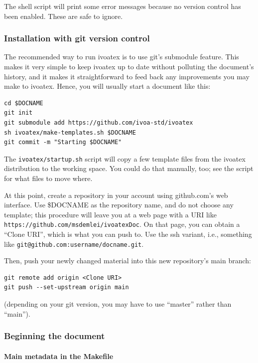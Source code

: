 \documentclass[11pt,a4paper]{ivoa}
\begin{document}
The shell script will print some error messages because no version
control has been enabled.  These are safe to ignore.

\subsubsection{Installation with git version control}

The recommended way to run ivoatex
is to use git's submodule feature.  This makes it very simple to keep
ivoatex up to date without polluting the
document's history, and it makes it straightforward to 
feed back any improvements you may make to ivoatex.  Hence, you will
usually start a document like this:

\begin{lstlisting}[basicstyle=\footnotesize]
cd $DOCNAME
git init
git submodule add https://github.com/ivoa-std/ivoatex
sh ivoatex/make-templates.sh $DOCNAME
git commit -m "Starting $DOCNAME"
\end{lstlisting}

The \verb|ivoatex/startup.sh| script will copy a few template files from
the ivoatex distribution to the working space.  You could do that
manually, too; see the script for what files to move where.

At this point, create a repository in your account using github.com's web
interface. Use \$DOCNAME as the repository name, and do not choose any
template; this procedure will leave you at a web page with a URI like
\nolinkurl{https://github.com/msdemlei/ivoatexDoc}.  
On that page, you can obtain a
``Clone URI'', which is what you can push to.  Use the ssh variant,
i.e., something like \verb|git@github.com:username/docname.git|.

Then, push your newly changed material into this new repository's main
branch:
\begin{lstlisting}[basicstyle=\footnotesize]
git remote add origin <Clone URI>
git push --set-upstream origin main
\end{lstlisting}
(depending on your git version, you may have to use ``master'' rather
than ``main'').

\subsubsection{Beginning the document}
\label{sect:beginning}

\paragraph{Main metadata in the Makefile}
\end{document}
